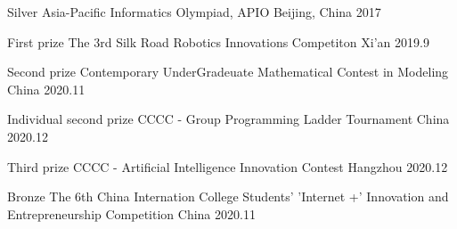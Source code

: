 



\begin{cvhonors}

\cvhonor
{Silver} %
{Asia-Pacific Informatics Olympiad, APIO} %
{Beijing, China} %
{2017} %

\end{cvhonors}




\begin{cvhonors}

\cvhonor
{First prize} %
{The 3rd Silk Road Robotics Innovations Competiton} %
{Xi'an} %
{2019.9} %


\cvhonor
{Second prize} %
{Contemporary UnderGradeuate Mathematical Contest in Modeling} %
{China} %
{2020.11} %

\cvhonor
{Individual second prize} %
{CCCC - Group Programming Ladder Tournament} %
{China} %
{2020.12} %

\cvhonor
{Third prize} %
{CCCC - Artificial Intelligence Innovation Contest} %
{Hangzhou} %
{2020.12} %

\cvhonor
{Bronze} %
{The 6th China Internation College Students' 'Internet +' Innovation and Entrepreneurship Competition} %
{China} %
{2020.11} %


\end{cvhonors}

